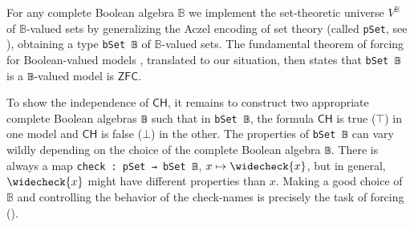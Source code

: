 \documentclass[sigplan,10pt,review, anonymous]{acmart}
\newcommand{\B}{\mathbb{B}}
\newcommand{\lil}{\lstinline}
\newcommand{\ZFC}{\mathsf{ZFC}}
\newcommand{\CH}{\mathsf{CH}}
\theoremstyle{definition}
\begin{document}
For any complete Boolean algebra $\mathbb{B}$ we implement the set-theoretic universe \(V^{\mathbb{B}}\) of \(\mathbb{B}\)-valued sets by generalizing the Aczel encoding of set theory (called \lil{pSet}, see ), obtaining a type \lil{bSet 𝔹} of $\mathbb{B}$-valued sets. The fundamental theorem of forcing for Boolean-valued models \cite{hamkins2012well}, translated to our situation, then states that \lil{bSet 𝔹} is a \lil{𝔹}-valued model is \(\ZFC\).

To show the independence of \(\CH\), it remains to construct two appropriate complete Boolean algebras \lil{𝔹} such that in \lil{bSet 𝔹}, the formula $\CH$ is true ($\top$) in one model and $\CH$ is false ($\bot$) in the other. The properties of \lil{bSet 𝔹} can vary wildly depending on the choice of the complete Boolean algebra \lil{𝔹}. There is always a map \lil{check : pSet → bSet 𝔹}, $x \mapsto \widecheck{x}$, but in general, $\widecheck{x}$ might have different properties than $x$. Making a good choice of \(\B\) and controlling the behavior of the check-names is precisely the task of forcing ().
\end{document}
